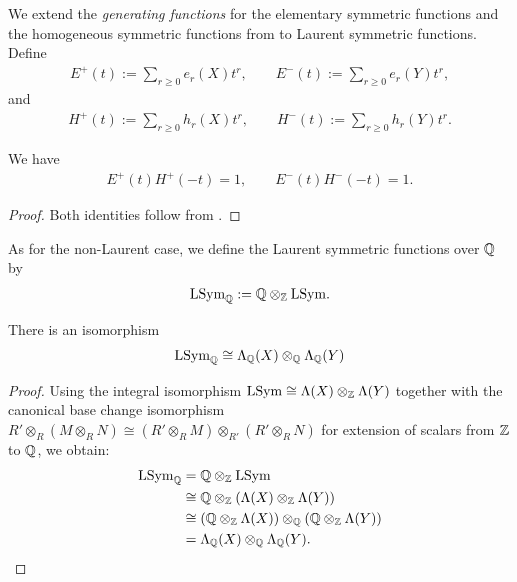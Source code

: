 \documentclass[11pt]{amsart}
\begin{document}
We extend the \emph{generating functions} for the elementary symmetric functions and the homogeneous symmetric functions from \cite[Ch.~I, \S2 Eqs.~2.2, 2.5, 2.10]{Mac15} to Laurent symmetric functions. Define
\begin{align}
    E^+(t):=\sum_{r\geq0}e_r(X)t^r,\qquad
    E^-(t):=\sum_{r\geq0}e_r(Y)t^r,
\end{align}
and
\begin{align}
    H^+(t):=\sum_{r\geq0}h_r(X)t^r,\qquad
    H^-(t):=\sum_{r\geq0}h_r(Y)t^r.
\end{align}

\begin{prop}
We have
\begin{align}
    E^+(t)H^+(-t)=1,\qquad E^-(t)H^-(-t)=1.
\end{align}
\end{prop}
\begin{proof}
    Both identities follow from \cite[Ch.~I, \S2, Eq.~(2.6)]{Mac15}.
\end{proof}


As for the non-Laurent case, we define the Laurent symmetric functions over $\mathbb{Q}$ by
    \begin{align}
        \mathrm{LSym}_{\mathbb{Q}} := \mathbb{Q} \otimes_{\mathbb{Z}} \mathrm{LSym}.
    \end{align}

    

\begin{prop}
    There is an isomorphism
    \[
    \mathrm{LSym}_{\mathbb{Q}} \cong \Lambda_{\mathbb{Q}}(X) \otimes_{\mathbb{Q}} \Lambda_{\mathbb{Q}} (Y)
    \]
\end{prop}

\begin{proof}

    Using the integral isomorphism $\mathrm{LSym} \cong \Lambda(X) \otimes_{\mathbb{Z}} \Lambda(Y)$ together with the canonical base change isomorphism $R' \otimes_R (M \otimes_R N) \cong (R' \otimes_R M) \otimes_{R'} (R' \otimes_R N)$ for extension of scalars from $\mathbb{Z}$ to $\mathbb{Q}$, we obtain:
    \begin{align*}
    \mathrm{LSym}_{\mathbb{Q}} &= \mathbb{Q} \otimes_{\mathbb{Z}} \mathrm{LSym} \\
    &\cong \mathbb{Q} \otimes_{\mathbb{Z}} (\Lambda(X) \otimes_{\mathbb{Z}} \Lambda(Y)) \\
    &\cong (\mathbb{Q} \otimes_{\mathbb{Z}} \Lambda(X)) \otimes_{\mathbb{Q}} (\mathbb{Q} \otimes_{\mathbb{Z}} \Lambda(Y)) \\
    &= \Lambda_{\mathbb{Q}}(X) \otimes_{\mathbb{Q}} \Lambda_{\mathbb{Q}}(Y).
    \end{align*}
\end{proof}
\end{document}
